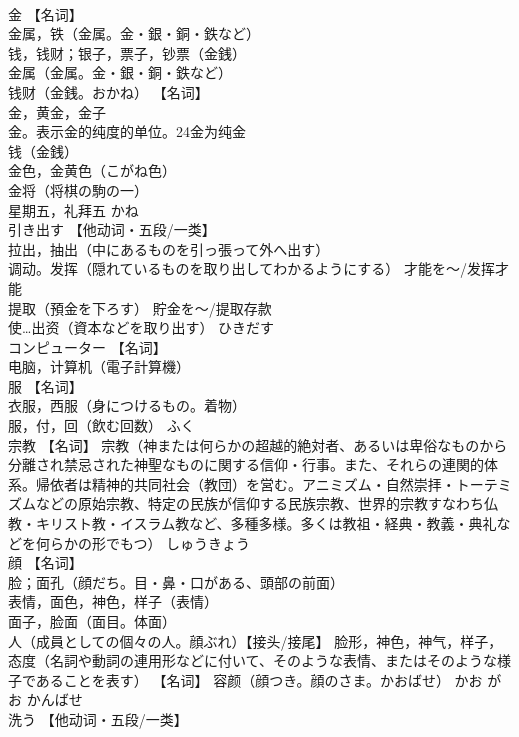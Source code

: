 \documentclass[8pt]{extreport}
\begin{document}
\begin{CJK}{UTF8}{min}
\\	金	【名词】 
\\	金属，铁（金属。金・銀・銅・鉄など） 
\\	钱，钱财；银子，票子，钞票（金銭） 
\\	金属（金属。金・銀・銅・鉄など） 
\\	钱财（金銭。おかね） 【名词】 
\\	金，黄金，金子 
\\	金。表示金的纯度的单位。24金为纯金 
\\	钱（金銭） 
\\	金色，金黄色（こがね色） 
\\	金将（将棋の駒の一） 
\\	星期五，礼拜五	かね	
\\	引き出す	【他动词・五段/一类】 
\\	拉出，抽出（中にあるものを引っ張って外へ出す） 
\\	调动。发挥（隠れているものを取り出してわかるようにする） 才能を～/发挥才能 
\\	提取（預金を下ろす） 貯金を～/提取存款 
\\	使…出资（資本などを取り出す）	ひきだす	
\\	コンピューター	【名词】 
\\	电脑，计算机（電子計算機）		
\\	服	【名词】 
\\	衣服，西服（身につけるもの。着物） 
\\	服，付，回（飲む回数）	ふく	
\\	宗教	【名词】 宗教（神または何らかの超越的絶対者、あるいは卑俗なものから分離され禁忌された神聖なものに関する信仰・行事。また、それらの連関的体系。帰依者は精神的共同社会（教団）を営む。アニミズム・自然崇拝・トーテミズムなどの原始宗教、特定の民族が信仰する民族宗教、世界的宗教すなわち仏教・キリスト教・イスラム教など、多種多様。多くは教祖・経典・教義・典礼などを何らかの形でもつ）	しゅうきょう	
\\	顔	【名词】 
\\	脸；面孔（顔だち。目・鼻・口がある、頭部の前面） 
\\	表情，面色，神色，样子（表情） 
\\	面子，脸面（面目。体面） 
\\	人（成員としての個々の人。顔ぶれ）【接头/接尾】 脸形，神色，神气，样子，态度（名詞や動詞の連用形などに付いて、そのような表情、またはそのような様子であることを表す） 【名词】 容颜（顔つき。顔のさま。かおばせ）	かお がお かんばせ	
\\	洗う	【他动词・五段/一类】 

\end{CJK}
\end{document}
